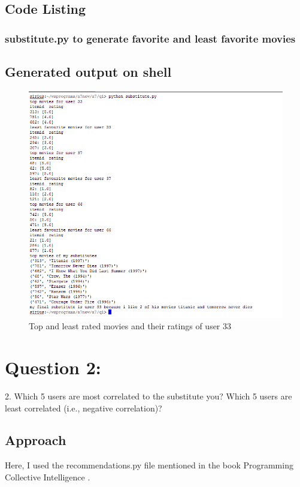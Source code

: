 \documentclass[12pt]{article}
\begin{document}
 \newpage

\subsection{Code Listing}
\subsubsection{substitute.py to generate favorite and least favorite movies }

\newpage


\subsection{Generated output on shell}
\begin{figure}[ht]
\includegraphics[scale=0.7]{../../q1/output.png}
\centering
\caption{Top and least rated movies and their ratings of user 33}
\label{fig:Top and least rated movies and their ratings of user 33}
\end{figure}


\newpage
\section{Question 2: }
2.  Which 5 users are most correlated to the substitute you? Which
5 users are least correlated (i.e., negative correlation)?


\subsection{Approach}
 Here, I used the recommendations.py file mentioned in the book Programming Collective Intelligence .
\end{document}
